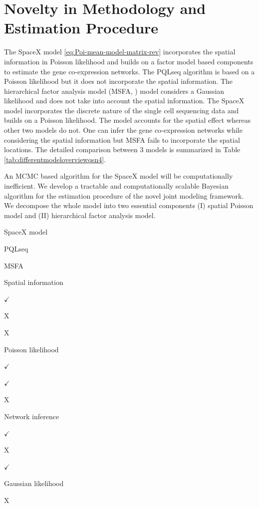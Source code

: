 \documentclass[
]{book}
\begin{document}
\hypertarget{novelty-in-methodology-and-estimation-procedure}{%
\section{Novelty in Methodology and Estimation Procedure}\label{novelty-in-methodology-and-estimation-procedure}}

The SpaceX model \eqref{eq:Poi-mean-model-matrix-rev} incorporates the spatial information in Poisson likelihood and builds on a factor model based components to estimate the gene co-expression networks. The PQLseq algorithm \citep{sun2018heritability} is based on a Poisson likelihood but it does not incorporate the spatial information. The hierarchical factor analysis model (MSFA, \citet{de2018bayesian}) model considers a Gaussian likelihood and does not take into account the spatial information. The SpaceX model incorporates the discrete nature of the single cell sequencing data and builds on a Poisson likelihood. The model accounts for the spatial effect whereas other two models do not. One can infer the gene co-expression networks while considering the spatial information but MSFA fails to incorporate the spatial locations. The detailed comparison between 3 models is summarized in Table \ref{tab:differentmodeloverviewqsn4}.

An MCMC based algorithm for the SpaceX model will be computationally inefficient. We develop a tractable and computationally scalable Bayesian algorithm for the estimation procedure of the novel joint modeling framework. We decompose the whole model into two essential components (I) spatial Poisson model and (II) hierarchical factor analysis model.

SpaceX model

PQLseq

MSFA

Spatial information

\(\checkmark\)

X

X

Poisson likelihood

\(\checkmark\)

\(\checkmark\)

X

Network inference

\(\checkmark\)

X

\(\checkmark\)

Gaussian likelihood

X
\end{document}
